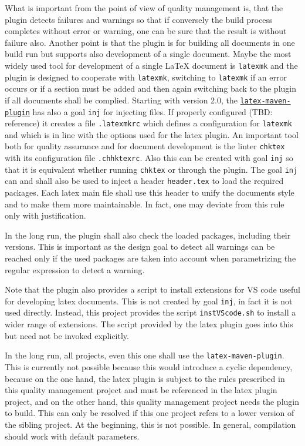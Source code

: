 \documentclass[a4paper,12pt]{article}
\begin{document}
What is important from the point of view of quality management is, 
that the plugin detects failures and warnings so 
that if conversely the build process completes without error or warning, 
one can be sure that the result is without failure also. 
Another point is that the plugin is for building all documents in one build run 
but supports also development of a single document. 
Maybe the most widely used tool for development of a single \LaTeX{} document 
is \texttt{latexmk} and the plugin is designed to cooperate with \texttt{latexmk}, 
switching to \texttt{latexmk} if an error occurs or if a section must be added 
and then again switching back to the plugin if all documents shall be complied. 
Starting with version 2.0, 
the \href{https://github.com/Reissner/latex-maven-plugin}{\texttt{latex-maven-plugin}} 
has also a goal \texttt{inj} for injecting files. 
If properly configured (TBD\@: reference) it creates a file \texttt{.latexmkrc} 
which defines a configuration for \texttt{latexmk} 
and which is in line with the options used for the latex plugin. 
An important tool both for quality assurance and for document development 
is the linter \texttt{chktex} with its configuration file \texttt{.chhktexrc}. 
Also this can be created with goal \texttt{inj} 
so that it is equivalent whether running \texttt{chktex} or through the plugin. 
The goal \texttt{inj} can and shall also be used to inject a header \texttt{header.tex} 
to load the required packages. 
Each latex main file shall use this header 
to unify the documents style and to make them more maintainable. 
In fact, one may deviate from this rule only with justification. 

In the long run, the plugin shall also check the loaded packages, 
including their versions. 
This is important as the design goal to detect all warnings 
can be reached only if the used packages are taken into account 
when parametrizing the regular expression to detect a warning. 

Note that the plugin also provides a script 
to install extensions for VS code useful for developing latex documents. 
This is not created by goal \texttt{inj}, 
in fact it is not used directly. 
Instead, this project provides the script \texttt{instVScode.sh} 
to install a wider range of extensions. 
The script provided by the latex plugin 
goes into this but need not be invoked explicitly. 






In the long run, 
all projects, even this one shall use the \texttt{latex-maven-plugin}. 
This is currently not possible because this would introduce a cyclic dependency, 
because on the one hand, the latex plugin is subject to the rules 
prescribed in this quality management project 
and must be referenced in the latex plugin project, 
and on the other hand, 
this quality management project needs the plugin to build. 
This can only be resolved if this one project 
refers to a lower version of the sibling project. 
At the beginning, this is not possible. 
In general, compilation should work with default parameters. 
\end{document}

